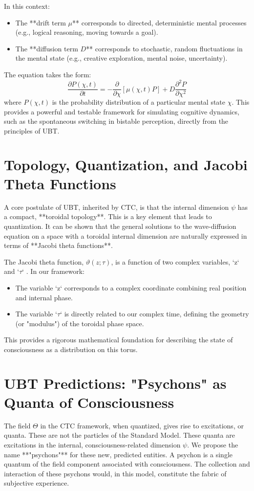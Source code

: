 \documentclass[12pt, a4paper]{article}
\begin{document}
In this context:
\begin{itemize}
    \item The **drift term \( \mu \)** corresponds to directed, deterministic mental processes (e.g., logical reasoning, moving towards a goal).
    \item The **diffusion term \( D \)** corresponds to stochastic, random fluctuations in the mental state (e.g., creative exploration, mental noise, uncertainty).
\end{itemize}
The equation takes the form:
\begin{equation}
    \frac{\partial P(\chi, t)}{\partial t} = -\frac{\partial}{\partial \chi}[\mu(\chi,t)P] + D \frac{\partial^2 P}{\partial \chi^2}
\end{equation}
where \( P(\chi, t) \) is the probability distribution of a particular mental state \( \chi \). This provides a powerful and testable framework for simulating cognitive dynamics, such as the spontaneous switching in bistable perception, directly from the principles of UBT.

\section{Topology, Quantization, and Jacobi Theta Functions}
A core postulate of UBT, inherited by CTC, is that the internal dimension \( \psi \) has a compact, **toroidal topology**. This is a key element that leads to quantization. It can be shown that the general solutions to the wave-diffusion equation on a space with a toroidal internal dimension are naturally expressed in terms of **Jacobi theta functions**.

The Jacobi theta function, \(\vartheta(z; \tau)\), is a function of two complex variables, `z` and `\(\tau\)` \cite{Whittaker1927}. In our framework:
\begin{itemize}
    \item The variable `z` corresponds to a complex coordinate combining real position and internal phase.
    \item The variable `\(\tau\)` is directly related to our complex time, defining the geometry (or "modulus") of the toroidal phase space.
\end{itemize}
This provides a rigorous mathematical foundation for describing the state of consciousness as a distribution on this torus.

\section{UBT Predictions: "Psychons" as Quanta of Consciousness}
The field \( \Theta \) in the CTC framework, when quantized, gives rise to excitations, or quanta. These are not the particles of the Standard Model. These quanta are excitations in the internal, consciousness-related dimension \( \psi \). We propose the name **"psychons"** for these new, predicted entities. A psychon is a single quantum of the field component associated with consciousness. The collection and interaction of these psychons would, in this model, constitute the fabric of subjective experience.
\end{document}
